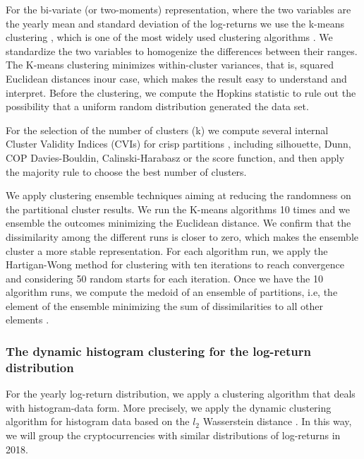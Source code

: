 \documentclass{bmcart}
\begin{document}
For the bi-variate (or two-moments) representation, where the two variables are  the yearly mean and standard deviation of the log-returns we use the k-means clustering \cite{KmeansMacQueen1967}, which is one of the most widely used clustering algorithms \cite{Wu2008Top10Alg}. We standardize the two variables to homogenize the differences between their ranges. The K-means clustering minimizes within-cluster variances, that is, squared Euclidean distances inour case, which makes the result easy to understand and interpret. Before the clustering, we compute the Hopkins statistic \cite{Banerjee2004ValidatingCU} to rule out the possibility that a uniform random distribution generated the data set. 

For the selection of the number of clusters (k) we compute several internal Cluster Validity Indices (CVIs) for crisp partitions \cite{Arbelaitz2013AnEC}, including silhouette, Dunn, COP Davies-Bouldin, Calinski-Harabasz or the score function, and then apply the majority rule to choose the best number of clusters.

We apply clustering ensemble techniques \cite{Ghosh2011} aiming at reducing the randomness on the partitional cluster results. We run the K-means algorithms 10 times and we ensemble the outcomes minimizing the Euclidean distance. We confirm that the dissimilarity among the different runs is closer to zero, which makes the ensemble cluster a more stable representation. For each algorithm run, we apply the Hartigan-Wong method for clustering \cite{HartiganWong1979} with ten iterations to reach convergence and considering 50 random starts for each iteration. Once we have the 10 algorithm runs, we compute the medoid of an ensemble of partitions, i.e, the element of the ensemble minimizing the sum of dissimilarities to all other elements \cite{Clue2019,Clue2019Rpackage}.


\subsubsection*{The dynamic histogram clustering for the log-return distribution}

For the yearly log-return distribution, we apply a clustering algorithm that deals with histogram-data form. More precisely, we apply the dynamic clustering algorithm for histogram data based on the $\mathit{l}_2$ Wasserstein distance  \cite{Irpino2006, HistogramClust2013}. In this way, we will group the cryptocurrencies with similar distributions of log-returns in 2018.
\end{document}
